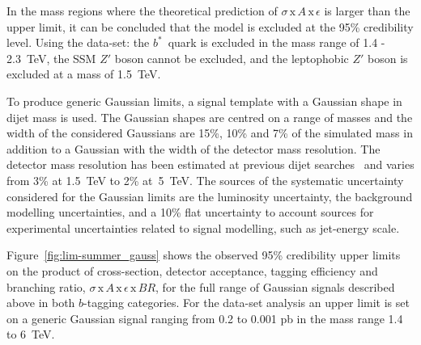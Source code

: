 
In the mass regions where the theoretical prediction of $\sigma\,\text{x}\,\mathit{A}\,\text{x}\,\epsilon$
is larger than the upper limit, it can be concluded that the model is excluded at the 95\% credibility level.
Using the \summer{} data-set:
the \mbox{$b^*$ quark} is excluded in the mass range of 1.4 - 2.3~TeV,
the SSM $Z'$ boson cannot be excluded,
and the leptophobic $Z'$ boson is excluded at a mass of 1.5~TeV.

To produce generic Gaussian limits,
a signal template with a Gaussian shape in dijet mass is used.
The Gaussian shapes are centred on a range of masses
and the width of the considered Gaussians are
15\%, 10\% and 7\% of the simulated mass
in addition to a Gaussian with the width of the detector mass resolution.
The detector mass resolution has been estimated
at previous dijet searches~\cite{dijet-mori16_paper}
and varies from 3\% at 1.5~TeV to 2\% at~5~TeV.
The sources of the systematic uncertainty considered for the Gaussian limits 
are the luminosity uncertainty,
the background modelling uncertainties,
and a 10\% flat uncertainty to account sources for
experimental uncertainties related to signal modelling,
such as jet-energy scale.

Figure~\ref{fig:lim-summer_gauss} shows the observed 95\% credibility upper limits
on the product of cross-section, detector acceptance, tagging efficiency and branching ratio,
$\sigma\,\text{x}\,\mathit{A}\,\text{x}\,\epsilon\,\text{x}\,\mathit{BR}$,
for the full range of Gaussian signals described above in both $b$-tagging categories.
For the \summer{} data-set analysis an upper limit is set on a generic Gaussian signal
ranging from 0.2 to 0.001 pb in the mass range 1.4 to 6~TeV.

